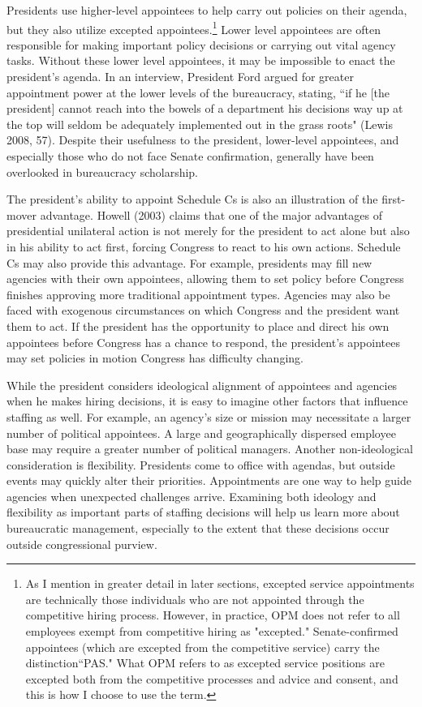 \documentclass[12pt]{article}
\begin{document}
Presidents use higher-level appointees to help carry out policies on their agenda, but they also utilize excepted appointees.\footnote{As I mention in greater detail in later sections, excepted service appointments are technically those individuals who are not appointed through the competitive hiring process. However, in practice, OPM does not refer to all employees exempt from competitive hiring as "excepted." Senate-confirmed appointees (which are excepted from the competitive service) carry the distinction``PAS." What OPM refers to as excepted service positions are excepted both from the competitive processes and advice and consent, and this is how I choose to use the term.} Lower level appointees are often responsible for making important policy decisions or carrying out vital agency tasks. Without these lower level appointees, it may be impossible to enact the president's agenda. In an interview, President Ford argued for greater appointment power at the lower levels of the bureaucracy, stating, ``if he [the president] cannot reach into the bowels of a department his decisions way up at the top will seldom be adequately implemented out in the grass roots" (Lewis 2008, 57). Despite their usefulness to the president, lower-level appointees, and especially those who do not face Senate confirmation, generally have been overlooked in bureaucracy scholarship.

The president's ability to appoint Schedule Cs is also an illustration of the first-mover advantage. Howell (2003) claims that one of the major advantages of presidential unilateral action is not merely for the president to act alone but also in his ability to act first, forcing Congress to react to his own actions. Schedule Cs may also provide this advantage. For example, presidents may fill new agencies with their own appointees, allowing them to set policy before Congress finishes approving more traditional appointment types. Agencies may also be faced with exogenous circumstances on which Congress and the president want them to act. If the president has the opportunity to place and direct his own appointees before Congress has a chance to respond, the president's appointees may set policies in motion Congress has difficulty changing.
	
While the president considers ideological alignment of appointees and agencies when he makes hiring decisions, it is easy to imagine other factors that influence staffing as well. For example, an agency's size or mission may necessitate a larger number of political appointees. A large and geographically dispersed employee base may require a greater number of political managers. Another non-ideological consideration is flexibility. Presidents come to office with agendas, but outside events may quickly alter their priorities. Appointments are one way to help guide agencies when unexpected challenges arrive. Examining both ideology and flexibility as important parts of staffing decisions will help us learn more about bureaucratic management, especially to the extent that these decisions occur outside congressional purview. 
	
\end{document}
